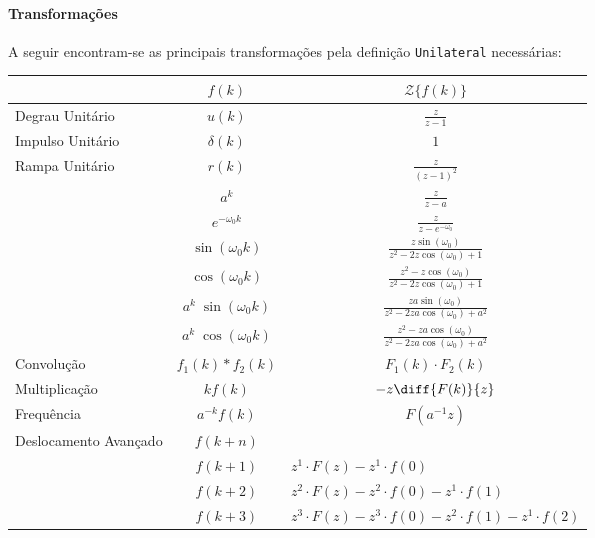 \documentclass{article}
\begin{document}
    \paragraph{Transformações}A seguir encontram-se as principais transformações pela definição \texttt{Unilateral} necessárias:
    \begin{table}[H]
        \centering\begingroup
        \renewcommand{\arraystretch}{1.5}
        \begin{tabular}[]{lcc}
                                & $f(k)$      & $\mathcal{Z}\{ f(k) \}$\\\hline
            Degrau Unitário     & $u(k)$      & $\frac{z}{z-1}$\\
            Impulso Unitário    & $\delta(k)$ & $1$\\
            Rampa Unitário      & $r(k)$      & $\frac{z}{(z-1)^2}$\\
                                & $a^{k}$     & $\frac{z}{z-a}$\\
                                & $e^{-\omega_0k}$  & $\frac{z}{z-e^{-\omega_0}}$\\
                                & $\sin(\omega_0 k)$ & $\frac{z\sin(\omega_0)}{z^2 - 2z\cos(\omega_0) + 1}$\\
                                & $\cos(\omega_0 k)$ & $\frac{z^2 - z\cos(\omega_0)}{z^2 - 2z\cos(\omega_0) + 1}$\\
                                & $a^k\;\sin(\omega_0 k)$ & $\frac{za\sin(\omega_0)}{z^2 - 2za\cos(\omega_0) + a^2}$\\
                                & $a^k\;\cos(\omega_0 k)$ & $\frac{z^2 - za\cos(\omega_0)}{z^2 - 2za\cos(\omega_0) + a^2}$\\
            Convolução          & $f_1(k) * f_2(k)$ & $F_1(k)\cdot F_2(k)$\\
            Multiplicação       & $k f(k)$ & $-z \diff{F(k)}{z}$\\
            Frequência          & $a^{-k}f(k)$ & $F(a^{-1}z)$\\
            Deslocamento Avançado & $f(k+n)$ &\\
                                  & $f(k+1)$ & \multicolumn{1}{l}{$z^1\cdot F(z) - z^1\cdot f(0)$}\\
                                  & $f(k+2)$ & \multicolumn{1}{l}{$z^2\cdot F(z) - z^2\cdot f(0) - z^1\cdot f(1)$}\\
                                  & $f(k+3)$ & \multicolumn{1}{l}{$z^3\cdot F(z) - z^3\cdot f(0) - z^2\cdot f(1) - z^1\cdot f(2)$}\\

\end{tabular}
\end{table}
\end{document}
